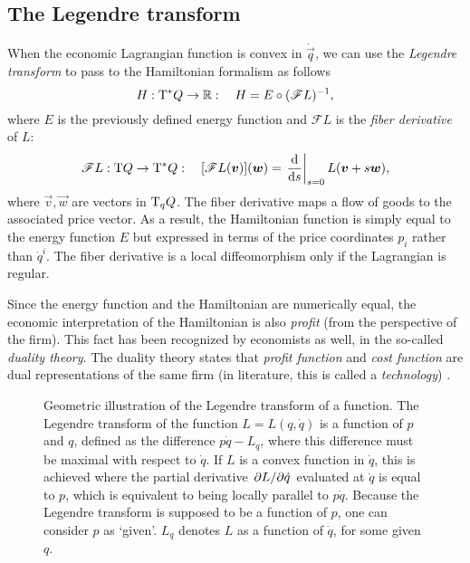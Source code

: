 \subsection{The Legendre transform} 
When the economic Lagrangian function is convex in \(\dot{\vec{q}}\), we can use the \emph{Legendre transform} to pass to the Hamiltonian formalism as follows \cite{Abraham1978}
\begin{equation}
    H: \mathrm{T}^*Q \to \mathbb{R}: \quad H = E \circ (\mathscr{F}L)^{-1},
\end{equation}
where \(E\) is the previously defined energy function and \(\mathscr{F}L\) is the \emph{fiber derivative} of \(L\): \cite{Marsden1998}
\begin{equation}
    \mathscr{F}L: \tbundle{Q} \to \ctbundle{Q}: \quad [\mathscr{F}L(\vec{v})](\vec{w}) = \left .\dv{}{s}\right|_{s = 0} L(\vec{v} + s\vec{w}),
\end{equation}
where \(\vec{v}, \vec{w}\) are vectors in \(\mathrm{T}_{q} Q\). The fiber derivative maps a flow of goods to the associated price vector. As a result, the Hamiltonian function is simply equal to the energy function \(E\) but expressed in terms of the price coordinates \(p_i\) rather than \(\dot{q}^i\). The fiber derivative is a local diffeomorphism only if the Lagrangian is regular.

Since the energy function and the Hamiltonian are numerically equal, the economic interpretation of the Hamiltonian is also \emph{profit} (from the perspective of the firm). This fact has been recognized by economists as well, in the so-called \emph{duality theory}. The duality theory states that \emph{profit function} and \emph{cost function} are dual representations of the same firm (in literature, this is called a \emph{technology}) \cite{blume2020,varianhalr1992}.

\begin{figure}[ht]
    \centering
    
    \caption{Geometric illustration of the Legendre transform of a function. The Legendre transform of the function $L = L(q, \dot{q})$ is a function of $p$ and $q$, defined as the difference $p\dot{q} - L_q$, where this difference must be maximal with respect to $\dot{q}$. If $L$ is a convex function in $\dot{q}$, this is achieved where the partial derivative $\pdv*{L}{\dot{q}}$ evaluated at $\dot{q}$ is equal to $p$, which is equivalent to being locally parallel to $p\dot{q}$. Because the Legendre transform is supposed to be a function of $p$, one can consider $p$ as `given'. $L_q$ denotes $L$ as a function of $\dot{q}$, for some given $q$.} 
    \label{fig:my_label}
\end{figure}

